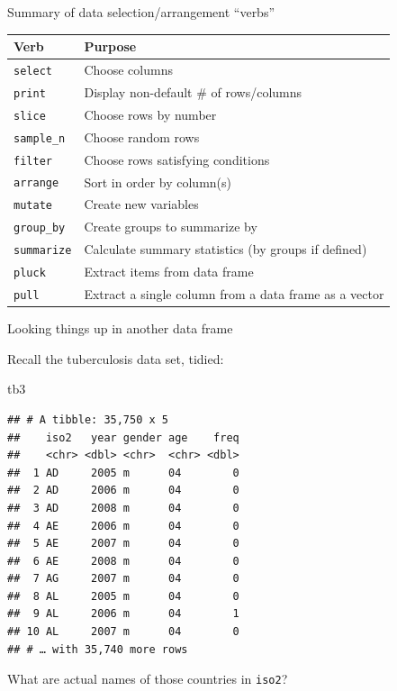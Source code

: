 \documentclass[ignorenonframetext,]{beamer}
\newenvironment{Shaded}{\begin{snugshade}}{\end{snugshade}}
\newcommand{\NormalTok}[1]{#1}
\begin{document}
\begin{frame}{Summary of data selection/arrangement ``verbs''}
\protect\hypertarget{summary-of-data-selectionarrangement-verbs}{}

\begin{tabular}{lp{}}
    Verb & Purpose\\
    \hline
    \texttt{select} & Choose columns\\
    \texttt{print} & Display non-default \# of rows/columns \\
    \texttt{slice} & Choose rows by number\\
    \texttt{sample\_n} & Choose random rows\\ 
    \texttt{filter} & Choose rows satisfying conditions \\
    \texttt{arrange}& Sort in order by column(s) \\
    \texttt{mutate} & Create new variables\\
    \texttt{group\_by} & Create groups to summarize by\\
    \texttt{summarize} & Calculate summary statistics (by groups if defined)\\
    \texttt{pluck} & Extract items from data frame\\
    \texttt{pull} & Extract a single column from a data frame as a vector\\
    \hline
  \end{tabular}

\end{frame}

\begin{frame}[fragile]{Looking things up in another data frame}
\protect\hypertarget{looking-things-up-in-another-data-frame}{}

Recall the tuberculosis data set, tidied:

\begin{Shaded}
\begin{Highlighting}[]
\NormalTok{tb3}
\end{Highlighting}
\end{Shaded}

\begin{verbatim}
## # A tibble: 35,750 x 5
##    iso2   year gender age    freq
##    <chr> <dbl> <chr>  <chr> <dbl>
##  1 AD     2005 m      04        0
##  2 AD     2006 m      04        0
##  3 AD     2008 m      04        0
##  4 AE     2006 m      04        0
##  5 AE     2007 m      04        0
##  6 AE     2008 m      04        0
##  7 AG     2007 m      04        0
##  8 AL     2005 m      04        0
##  9 AL     2006 m      04        1
## 10 AL     2007 m      04        0
## # … with 35,740 more rows
\end{verbatim}

What are actual names of those countries in \texttt{iso2}?

\end{frame}
\end{document}
